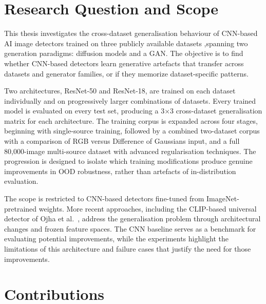 
\section{Research Question and Scope}
\label{sec:research_question}

This thesis investigates the cross-dataset generalisation behaviour of CNN-based AI image
detectors trained on three publicly available datasets ,spanning two generation paradigms:
diffusion models and a GAN. The objective is to find whether CNN-based detectors learn generative
artefacts that transfer across datasets and generator families, or if they memorize
dataset-specific patterns.

Two architectures, ResNet-50 and ResNet-18,
are trained on each dataset individually and on progressively larger combinations of
datasets. Every trained model is evaluated on every test set, producing a 3$\times$3
cross-dataset generalisation matrix for each architecture. The training corpus is expanded
across four stages, beginning with single-source training, followed by a combined
two-dataset corpus with a comparison of RGB versus Difference of Gaussians input, and a full 80,000-image multi-source
dataset with advanced regularisation techniques. The progression is designed to isolate which training
modifications produce genuine improvements in OOD robustness, rather than artefacts of
in-distribution evaluation.

The scope is restricted to CNN-based detectors fine-tuned from ImageNet-pretrained
weights. More recent approaches, including the CLIP-based universal detector of Ojha
et al.~\cite{ojha2023}, address the generalisation problem through architectural changes
and frozen feature spaces. The CNN baseline serves as a benchmark for evaluating potential 
improvements, while the experiments highlight the limitations of this architecture 
and failure cases that justify the need for those improvements.



\section{Contributions}
\label{sec:contributions_intro}


